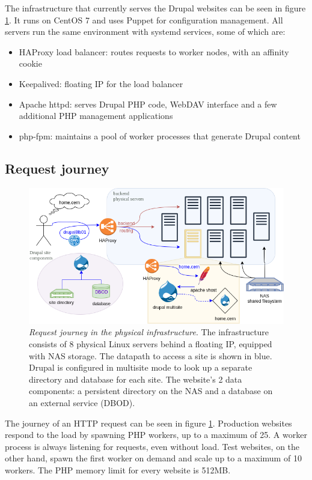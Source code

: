 The infrastructure that currently serves the Drupal websites can be seen in figure \ref{fig:drupal-physical-request-journey}.
It runs on CentOS 7 and uses Puppet for configuration management.
All servers run the same environment with systemd services, some of which are:
\begin{itemize}
    \item HAProxy load balancer: routes requests to worker nodes, with an affinity cookie
    \item Keepalived: floating IP for the load balancer
    \item Apache httpd: serves Drupal PHP code, WebDAV interface and a few additional PHP management applications
    \item php-fpm: maintains a pool of worker processes that generate Drupal content
\end{itemize}

\subsection{Request journey}

\begin{figure}
    \centering
    \hspace{-2em}
    \includegraphics[width=.66\textwidth]{figures/drupal-physical-request-journey}
    \caption{\emph{Request journey in the physical infrastructure}.
    The infrastructure consists of 8 physical Linux servers behind a floating IP, equipped with NAS storage.
    The {\color{blue} datapath} to access a site is shown in blue. 
    Drupal is configured in multisite mode to look up a separate directory and database for each site.
    The website's {\color{asparagus} 2 data components}: a persistent directory on the NAS and a database on an external service (DBOD).
    }
    \vspace{-4em}
    \label{fig:drupal-physical-request-journey}
\end{figure}

The journey of an HTTP request can be seen in figure \ref{fig:drupal-physical-request-journey}.
Production websites respond to the load by spawning PHP workers, up to a maximum of 25.
A worker process is always listening for requests, even without load.
Test websites, on the other hand, spawn the first worker on demand and scale up to a maximum of 10 workers.
The PHP memory limit for every website is 512MB.


